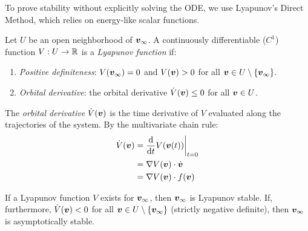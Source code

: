 To prove stability without explicitly solving the ODE, we use Lyapunov's Direct Method, which relies on energy-like scalar functions.

\begin{definition}
Let $U$ be an open neighborhood of $\bm{v}_\infty$. A continuously differentiable ($C^1$) function $V: U \to \mathbb{R}$ is a \textit{Lyapunov function} if:
\begin{enumerate}
\item \textit{Positive definiteness}: $V(\bm{v}_\infty) = 0$ and $V(\bm{v}) > 0$ for all $\bm{v} \in U \setminus \{\bm{v}_\infty\}$.
\item \textit{Orbital derivative}: the orbital derivative $\dot{V}(\bm{v}) \leq 0$ for all $\bm{v} \in U$.
\end{enumerate}
The \textit{orbital derivative} $\dot{V}(\bm{v})$ is the time derivative of $V$ evaluated along the trajectories of the system. By the multivariate chain rule:
\begin{equation}
\begin{aligned}
\dot{V}(\bm{v}) &= \frac{\mathrm{d}}{\mathrm{d} t} V(\bm{v}(t)) \bigg|_{t=0} \\
&= \nabla V(\bm{v}) \cdot \dot{\bm{v}} \\
&= \nabla V(\bm{v}) \cdot f(\bm{v})
\end{aligned}
\end{equation}

\end{definition}

\begin{theorem}
If a Lyapunov function $V$ exists for $\bm{v}_\infty$, then $\bm{v}_\infty$ is Lyapunov stable. If, furthermore, $\dot{V}(\bm{v}) < 0$ for all $\bm{v} \in U \setminus \{\bm{v}_\infty\}$ (strictly negative definite), then $\bm{v}_\infty$ is asymptotically stable.
\end{theorem}

